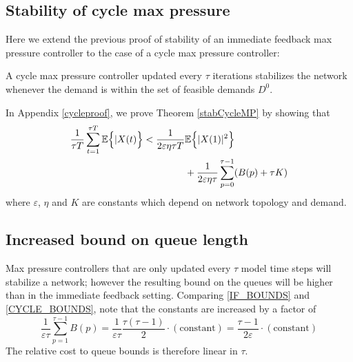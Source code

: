 \subsection*{Stability of cycle max pressure}

Here we extend the previous proof of stability of an immediate feedback max pressure controller to the case of a cycle max pressure controller: 

\begin{Thm}\label{stabCycleMP}
A cycle max pressure controller updated every $\tau$ iterations stabilizes the network whenever the demand is within the set of feasible demands $D^{0}$.
\end{Thm}

In Appendix \ref{cycleproof}, we prove Theorem \ref{stabCycleMP} by showing that
\begin{align} \label{CYCLE_BOUNDS}
\dfrac{1}{\tau T} \displaystyle\sum_{t=1}^{\tau T} \expectation{\vert X(t)}< \dfrac{1}{2\varepsilon\eta\tau T}& \expectation{\vert X(1) \vert^{2}} \\ \nonumber
& + \dfrac{1}{2\varepsilon\eta\tau}\displaystyle\sum_{p=0}^{\tau - 1} (B(p) + \tau K)
\end{align}
where $\varepsilon$, $\eta$ and $K$ are constants which depend on network topology and demand.



\subsection*{Increased bound on queue length}
Max pressure controllers that are only updated every $\tau$ model time steps will stabilize a network; however the resulting bound on the queues will be higher than in the immediate feedback setting. 
Comparing \eqref{IF_BOUNDS} and \eqref{CYCLE_BOUNDS}, note that the constants are increased by a factor of
\begin{equation}
\dfrac{1}{\varepsilon \tau} \sum_{p=1}^{\tau - 1} B(p) = \dfrac{1}{\varepsilon \tau}  \dfrac{\tau(\tau - 1)}{2}\cdot(\text{constant}) = \dfrac{\tau - 1}{2\varepsilon} \cdot(\text{constant})
\end{equation}
The relative cost to queue bounds is therefore linear in $\tau$. 